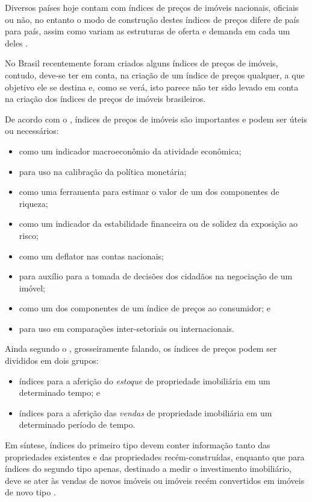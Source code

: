\documentclass[
	12pt,				%
	oneside,			%
	a4paper,			%
	chapter=TITLE,		%
	section=TITLE,		%
	english,			%
	brazil				%
	]{abntex2}
\begin{document}
Diversos países hoje contam com índices de preços de imóveis nacionais, oficiais
ou não, no entanto o modo de construção destes índices de preços difere de país
para país, assim como variam as estruturas de oferta e demanda em cada um deles
\autocite[3-4]{regulation}.

No Brasil recentemente foram criados alguns índices de preços de imóveis,
contudo, deve-se ter em conta, na criação de um índice de preços qualquer, a que
objetivo ele se destina e, como se verá, isto parece não ter sido levado em
conta na criação dos índices de preços de imóveis brasileiros.

De acordo com o \textcite{rppi}, índices de preços de imóveis são importantes e podem ser
úteis ou necessários:
\begin{itemize}
\tightlist
\item
  como um indicador macroeconômio da atividade econômica;
\item
  para uso na calibração da política monetária;
\item
  como uma ferramenta para estimar o valor de um dos componentes de riqueza;
\item
  como um indicador da estabilidade financeira ou de solidez da exposição ao
  risco;
\item
  como um deflator nas contas nacionais;
\item
  para auxílio para a tomada de decisões dos cidadãos na negociação de um imóvel;
\item
  como um dos componentes de um índice de preços ao consumidor; e
\item
  para uso em comparações inter-setoriais ou internacionais.
\end{itemize}
Ainda segundo o \textcite{rppi}, grosseiramente falando, os índices de preços podem ser
divididos em dois grupos:
\begin{itemize}
\tightlist
\item
  índices para a aferição do \emph{estoque} de propriedade imobiliária em um
  determinado tempo; e
\item
  índices para a aferição das \emph{vendas} de propriedade imobiliária em um
  determinado período de tempo.
\end{itemize}
Em síntese, índices do primeiro tipo devem conter informação tanto das
propriedades existentes e das propriedades recém-construídas, enquanto que para
índices do segundo tipo apenas, destinado a medir o investimento imobiliário,
deve se ater às vendas de novos imóveis ou imóveis recém convertidos em imóveis
de novo tipo \autocite[155]{rppi}.
\end{document}
